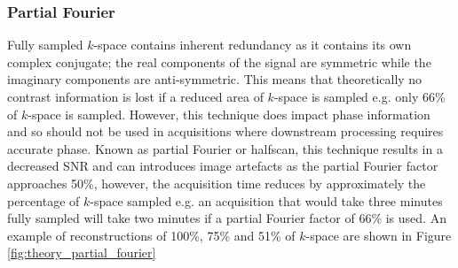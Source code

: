 \subsubsection{Partial Fourier}
\label{subsec:theory_partial_fourier}
Fully sampled $k$-space contains inherent redundancy as it contains its own complex conjugate; the real components of the signal are symmetric while the imaginary components are anti-symmetric. This means that theoretically no contrast information is lost if a reduced area of $k$-space is sampled e.g. only 66\% of $k$-space is sampled. However, this technique does impact phase information and so should not be used in acquisitions where downstream processing requires accurate phase. Known as partial Fourier or halfscan, this technique results in a decreased \ac{SNR} and can introduces image artefacts as the partial Fourier factor approaches 50\%, however, the acquisition time reduces by approximately the percentage of $k$-space sampled e.g. an acquisition that would take three minutes fully sampled will take two minutes if a partial Fourier factor of 66\% is used. An example of reconstructions of 100\%, 75\% and 51\% of $k$-space are shown in Figure \ref{fig:theory_partial_fourier}

